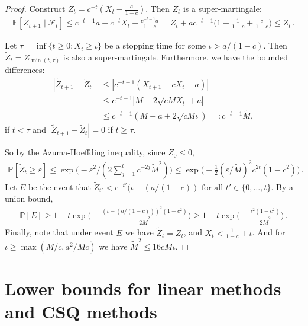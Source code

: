 \documentclass[11pt]{article}
\renewcommand{\P}{\mathbb{P}}
\newcommand{\E}{\mathbb{E}}
\newcommand{\eps}{\varepsilon}
\newcommand{\<}{\langle}
\renewcommand{\>}{\rangle}
\theoremstyle{definition}
\def\cF{{\mathcal F}}
\def\cF{{\mathcal F}}
\def\eps{\varepsilon}
\begin{document}
\begin{proof}
Construct $Z_t = c^{-t} (X_t - \frac{a}{1-c})$. Then $Z_t$ is a super-martingale:
\begin{align*}
\E[Z_{t+1} \mid \cF_t] \leq c^{-t-1}a + c^{-t}X_t - \frac{c^{-t-1}a}{1-c} = Z_t + a c^{-t-1} \Big(1 - \frac{1}{1-c} + \frac{c}{1-c} \Big) \leq Z_t\,.
\end{align*}

Let $\tau = \inf \{t \geq 0: X_t \geq \iota\}$ be a stopping time for some $\iota > a / (1-c)$. Then $\tilde{Z}_t = Z_{\min(t,\tau)}$ is also a super-martingale. Furthermore, we have the bounded differences:
\begin{align*}
|\tilde{Z}_{t+1} - \tilde{Z}_t| &\leq |c^{-t-1}(X_{t+1} - cX_t - a)| \\
&\leq c^{-t-1}|M + 2\sqrt{cMX_t} + a| \\
&\leq c^{-t-1} (M+a + 2\sqrt{cM\iota}) =: c^{-t-1}\tilde{M} ,
\end{align*}
if $t < \tau$ and $|\tilde{Z}_{t+1} - \tilde{Z}_t| = 0$ if $t \geq \tau$.

So by the Azuma-Hoeffding inequality, since $Z_0 \leq 0$,
\begin{align*}
\P[\tilde{Z}_t \geq \eps] \leq \exp \Big(-\eps^2 / (2\sum_{j=1}^{t} c^{-2j} \tilde{M}^2) \Big) \leq \exp \Big(-\frac{1}{2}(\eps / \tilde{M})^2 c^{2t} (1-c^2) \Big)\,.
\end{align*}
Let $E$ be the event that $\tilde{Z}_{t'} < c^{-{t'}}(\iota - (a/(1-c)) \mbox{ for all } t' \in \{0,\ldots,t\}$. By a union bound,
\begin{align*}
\P[E] \geq 1  - t \exp \Big(-\frac{(\iota - (a/(1-c)))^2(1-c^2)}{2\tilde{M}^2} \Big) \geq 1 - t\exp \Big(-\frac{\iota^2(1-c^2)}{2\tilde{M}^2} \Big)\,.
\end{align*}
Finally, note that under event $E$ we have $\tilde{Z}_t = Z_t$, and $X_t < \frac{1}{1-c} + \iota$. And for $\iota \geq \max(M / c, a^2 / Mc)$ we have $\tilde{M}^2 \leq 16 c M \iota$.
\end{proof}




\clearpage




\section{Lower bounds for linear methods and CSQ methods}\label{app:lower_bounds}
\end{document}
